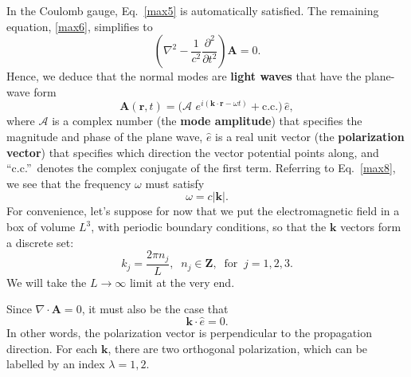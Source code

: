 \documentclass[pra,12pt]{revtex4}
\begin{document}
In the Coulomb gauge, Eq.~\eqref{max5} is automatically satisfied.
The remaining equation, \eqref{max6}, simplifies to
\begin{equation}
  \left(\nabla^2 - \frac{1}{c^2}\frac{\partial^2}{\partial t^2}\right)
  \mathbf{A} = 0. \label{max8}
\end{equation}
Hence, we deduce that the normal modes are \textbf{light waves} that
have the plane-wave form
\begin{equation}
  \mathbf{A}(\mathbf{r},t) = \Big(\mathcal{A}\,
  \, e^{i(\mathbf{k}\cdot\mathbf{r} - \omega t)} + \mathrm{c.c.}\Big)\, \hat{e},
  \label{lightplanewave}
\end{equation}
where $\mathcal{A}$ is a complex number (the \textbf{mode amplitude})
that specifies the magnitude and phase of the plane wave, $\hat{e}$ is
a real unit vector (the \textbf{polarization vector}) that specifies
which direction the vector potential points along, and
``c.c.''~denotes the complex conjugate of the first term.  Referring
to Eq.~\eqref{max8}, we see that the frequency $\omega$ must satisfy
\begin{equation}
  \omega = c|\mathbf{k}|.
\end{equation}
For convenience, let's suppose for now that we put the electromagnetic
field in a box of volume $L^3$, with periodic boundary conditions, so
that the $\mathbf{k}$ vectors form a discrete set:
\begin{equation}
  k_j = \frac{2\pi n_j}{L}, \;\; n_j \in \mathbf{Z}, \;\;\mathrm{for}
  \;\; j = 1,2,3.
\end{equation}
We will take the $L \rightarrow \infty$ limit at the very end.

Since $\nabla \cdot \mathbf{A} = 0$, it must also be the case that
\begin{equation}
  \mathbf{k} \cdot \hat{e} = 0.
\end{equation}
In other words, the polarization vector is perpendicular to the
propagation direction.  For each $\mathbf{k}$, there are two
orthogonal polarization, which can be labelled by an index $\lambda =
1,2$.
\end{document}
